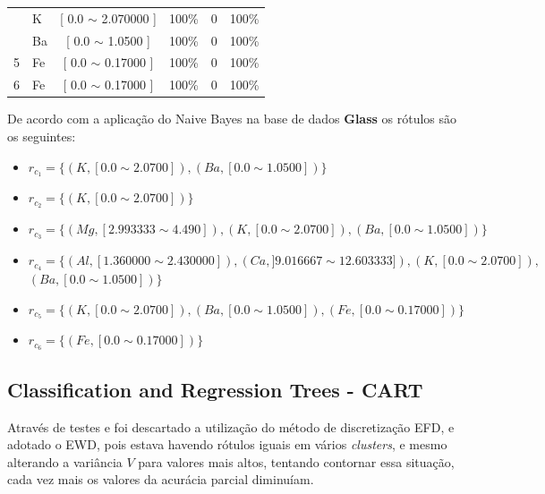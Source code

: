 \begin{table}[!h]
{\begin{tabular}{llcrcc}
                                            & K     & [ 0.0 $\sim$  2.070000     ]       & 100\%                               & 0 & 100\%\\  
                                            & Ba    & [ 0.0 $\sim$  1.0500     ]       & 100\%                               & 0 & 100\% \\   
\multirow{-3}{*}{5}                         & Fe    & [ 0.0 $\sim$  0.17000     ]       & 100\%                               & 0 & 100\% \\  \hline
6                                            & Fe    & [ 0.0 $\sim$  0.17000     ]       & 100\%                               & 0 & 100\% \\  \hline

\hline

\end{tabular}
}
\end{table}



De acordo com a aplicação do Naive Bayes na base de dados \textbf{Glass} os rótulos são os seguintes:
\begin{itemize}[noitemsep]
 \item ${r_{c_1}=\{ (K,[ 0.0 \sim  2.0700 ] ), (Ba,[ 0.0 \sim 1.0500 ] ) \} }$  
 \item ${r_{c_2}=\{ (K,[ 0.0 \sim  2.0700 ] ) \} }$
 \item ${r_{c_3}=\{ (Mg, [ 2.993333 \sim  4.490]), (K,[ 0.0 \sim  2.0700 ] ), (Ba,[ 0.0 \sim 1.0500 ] )  \} }$  
 \item ${r_{c_4}=\{(Al,[ 1.360000 \sim  2.430000 ] ), (Ca,] 9.016667 \sim  12.603333] ), (K,[  0.0 \sim  2.0700 ] ),}$  
${ (Ba,[ 0.0 \sim 1.0500 ] ) \} }$
 \item ${r_{c_5}=\{ (K,[ 0.0 \sim  2.0700 ] ), (Ba,[ 0.0 \sim 1.0500 ] ), (Fe,[ 0.0 \sim 0.17000] ) \} }$
 \item ${r_{c_6}=\{ (Fe,[ 0.0 \sim 0.17000] ) \} }$
\end{itemize}


\subsection{Classification and Regression Trees - CART} \label{cap:resultados:ssec:glass:cart}


Através de testes e foi descartado a utilização do método de discretização EFD, e adotado o EWD, pois estava havendo  rótulos iguais em vários \textit{clusters}, e mesmo alterando a variância ${V}$ para valores mais altos, tentando contornar essa situação, cada vez mais os valores da acurácia parcial diminuíam. 

